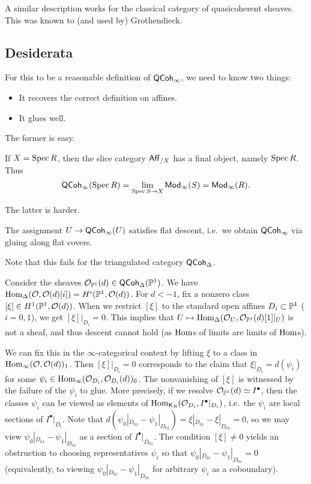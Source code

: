 \documentclass{article}
\begin{document}
\begin{rmk}
	A similar description works for the classical category of quasicoherent sheaves.
	This was known to (and used by) Grothendieck.
\end{rmk}

\subsection{Desiderata}

For this to be a reasonable definition of $\mathsf{QCoh}_\infty$, we need to know two things:
\begin{itemize}
	\item It recovers the correct definition on affines.
	\item It glues well.
\end{itemize}

The former is easy.

\begin{ex}
	If $X = \operatorname{Spec} R$, then the slice category $\mathsf{Aff}_{/X}$ has a final object, namely $\operatorname{Spec} R$.
	Thus
	\[
		\mathsf{QCoh}_\infty(\operatorname{Spec} R) = \lim_{\operatorname{Spec} S \to X} \mathsf{Mod}_\infty(S) = \mathsf{Mod}_\infty(R).
	\]
\end{ex}

The latter is harder.

\begin{thm}[Grothendieck]
	The assignment $U \to \mathsf{QCoh}_\infty(U)$ satisfies flat descent, i.e.\ we obtain $\mathsf{QCoh}_\infty$ via gluing along flat covers.
\end{thm}

Note that this fails for the triangulated category $\mathsf{QCoh}_\Delta$.

\begin{ex}
	Consider the sheaves $\mathcal{O}_{\mathbb{P}^1}(d) \in \mathsf{QCoh}_\Delta(\mathbb{P}^1)$.
	We have $\operatorname{Hom}_\Delta(\mathcal{O}, \mathcal{O}(d)[i]) = H^i(\mathbb{P}^1, \mathcal{O}(d))$.
	For $d < -1$, fix a nonzero class $[\xi] \in H^1(\mathbb{P}^1, \mathcal{O}(d))$.
	When we restrict $[\xi]$ to the standard open affines $D_i \subset \mathbb{P}^1$ ($i = 0, 1$), we get $[\xi]|_{D_i} = 0$.
	This implies that $U \mapsto \operatorname{Hom}_\Delta(\mathcal{O}_U, \mathcal{O}_{\mathbb{P}^1}(d)[1]|_U)$ is not a sheaf, and thus descent cannot hold (as $\operatorname{Hom}$s of limits are limits of $\operatorname{Hom}$s).

	We can fix this in the $\infty$-categorical context by lifting $\xi$ to a class in $\operatorname{Hom}_\infty(\mathcal{O}, \mathcal{O}(d))_1$.
	Then $[\xi]|_{D_i} = 0$ corresponds to the claim that $\xi|_{D_i} = d(\psi_i)$ for some $\psi_i \in \operatorname{Hom}_\infty(\mathcal{O}_{D_i}, \mathcal{O}_{D_i}(d))_0$.
	The nonvanishing of $[\xi]$ is witnessed by the failure of the $\psi_i$ to glue.
	More precisely, if we resolve $\mathcal{O}_{\mathbb{P}^1}(d) \simeq I^\bullet$, then the classes $\psi_i$ can be viewed as elements of $\operatorname{Hom}_{\mathsf{K}_R}(\mathcal{O}_{D_i}, I^\bullet|_{D_i})$, i.e.\ the $\psi_i$ are local sections of $I^\bullet|_{D_i}$.
	Note that $d(\psi_0|_{D_{01}} - \psi_1|_{D_{01}}) = \xi|_{D_{01}} - \xi|_{D_{01}} = 0$, so we may view $\psi_0|_{D_{01}} - \psi_1|_{D_{01}}$ as a section of $I^\bullet|_{D_{01}}$.
	The condition $[\xi] \neq 0$ yields an obstruction to choosing representatives $\psi_i$ so that $\psi_0|_{D_{01}} - \psi_1|_{D_{01}} = 0$ (equivalently, to viewing $\psi_0|_{D_{01}} - \psi_1|_{D_{01}}$ for arbitrary $\psi_i$ as a coboundary).
\end{ex}
\end{document}
